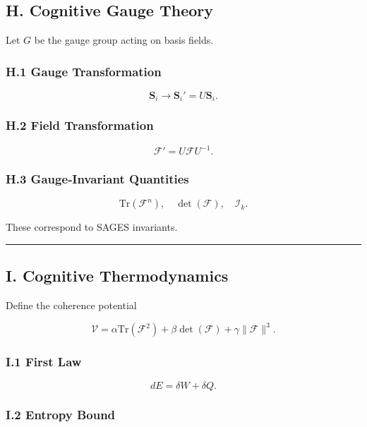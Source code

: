\subsection{H. Cognitive Gauge Theory}\label{h.-cognitive-gauge-theory}

Let \(G\) be the gauge group acting on basis fields.

\subsubsection{H.1 Gauge Transformation}\label{h.1-gauge-transformation}

\[
\mathbf{S}_i \rightarrow \mathbf{S}_i' = U \mathbf{S}_i.
\]

\subsubsection{H.2 Field Transformation}\label{h.2-field-transformation}

\[
\mathcal{F}' = U \mathcal{F} U^{-1}.
\]

\subsubsection{H.3 Gauge‑Invariant Quantities}\label{h.3-gaugeinvariant-quantities}

\[
\text{Tr}(\mathcal{F}^n), \quad \det(\mathcal{F}), \quad \mathcal{I}_k.
\]

These correspond to SAGES invariants.

\begin{center}\rule{0.5\linewidth}{0.5pt}\end{center}

\subsection{I. Cognitive Thermodynamics}\label{i.-cognitive-thermodynamics}

Define the coherence potential

\[
\mathcal{V} = \alpha \text{Tr}(\mathcal{F}^2) + \beta \det(\mathcal{F}) + \gamma \|\mathcal{F}\|^3.
\]

\subsubsection{I.1 First Law}\label{i.1-first-law}

\[
dE = \delta W + \delta Q.
\]

\subsubsection{I.2 Entropy Bound}\label{i.2-entropy-bound}

